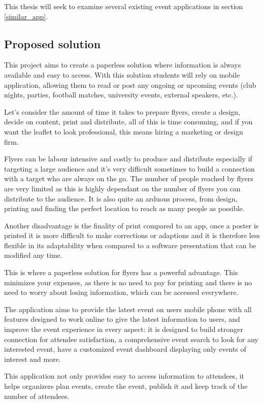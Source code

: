 This thesis will seek to examine several existing event applications in section \ref{similar_app}.

\subsection{Proposed solution}
This project aims to create a paperless solution where information is always available and easy to access. With this solution students will rely on mobile application, allowing them to read or post any ongoing or upcoming events (club nights, parties, football matches, university events, external speakers, etc.).

Let's consider the amount of time it takes to prepare flyers, create a design, decide on content, print and distribute, all of this is time consuming, and if you want the leaflet to look professional, this means hiring a marketing or design firm.

Flyers can be labour intensive and costly to produce and distribute especially if targeting a large audience and it’s very difficult sometimes to build a connection with a target who are always on the go. The number of people reached by flyers are very limited as this is highly dependant on the number of flyers you can distribute to the audience. It is also quite an arduous process, from design, printing and finding the perfect location to reach as many people as possible. 

Another disadvantage is the finality of print compared to an app, once a poster is printed it is more difficult to make corrections or adaptions and it is therefore less flexible in its adaptability when compared to a software presentation that can be modified any time.  

This is where a paperless solution for flyers has a powerful advantage. This minimizes your expenses, as there is no need to pay for printing and there is no need to worry about losing information, which can be accessed everywhere.

The application aims to provide the latest event on users mobile phone with all features designed to work online to give the latest information to users, and improve the event experience in every aspect: it is designed to build stronger connection for attendee satisfaction, a comprehensive event search to look for any interested event, have a customized event dashboard displaying only events of interest and more.

This application not only provides easy to access information to attendees, it helps organizers plan events, create the event, publish it and keep track of the number of attendees.

